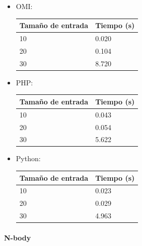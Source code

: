 \begin{itemize}
\item OMI: \\
    \FloatBarrier
   \begin{table}[h]
    \begin{center}
   \begin{tabular}{|l|l|} \hline 
   \bf{Tamaño de entrada} & \bf{Tiempo (s)} \\ \hline 
   10 & 0.020 \\ \hline 
   20 &  0.104 \\ \hline
   30 & 8.720 \\ \hline 
   \end{tabular}
   \end{center}
   \end{table}
   \FloatBarrier
\item PHP: \\
   \begin{table}[h]
    \begin{center}
   \begin{tabular}{|l|l|} \hline 
   \bf{Tamaño de entrada} & \bf{Tiempo (s)} \\ \hline 
   10 & 0.043 \\ \hline 
   20 & 0.054	 \\ \hline
   30 & 5.622 \\ \hline 
   \end{tabular}
   \end{center}
   \end{table}
   \FloatBarrier
\item Python: \\
   \begin{table}[h]
    \begin{center}
   \begin{tabular}{|l|l|} \hline 
   \bf{Tamaño de entrada} & \bf{Tiempo (s)} \\ \hline 
   10 & 0.023	 \\ \hline 
   20 & 0.029	 \\ \hline
   30 & 4.963 \\ \hline 
   \end{tabular}
   \end{center}
   \end{table}
   \FloatBarrier
\end{itemize}

\paragraph{N-body}

